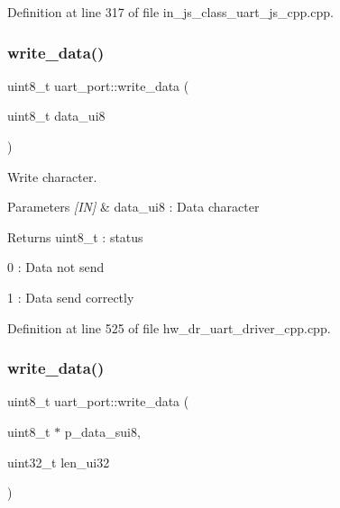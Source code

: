 Definition at line 317 of file in\+\_\+js\+\_\+class\+\_\+uart\+\_\+js\+\_\+cpp.\+cpp.

\mbox{\label{group___u_a_r_t_ga72cb7ce349132f57cfda6cb929f72bc5}} 
\subsubsection{write\_data()\hspace{0.1cm}{\footnotesize\ttfamily [1/3]}}
{\footnotesize\ttfamily uint8\+\_\+t uart\+\_\+port\+::write\+\_\+data (\begin{DoxyParamCaption}\item[{uint8\+\_\+t}]{data\+\_\+ui8 }\end{DoxyParamCaption})}



Write character. 


\begin{DoxyParams}{Parameters}
{\em \mbox{[}\+I\+N\mbox{]}} & data\+\_\+ui8 \+: Data character \\
\hline
\end{DoxyParams}
\begin{DoxyReturn}{Returns}
uint8\+\_\+t \+: status \begin{DoxyItemize}
\item 0 \+: Data not send \item 1 \+: Data send correctly \end{DoxyItemize}

\end{DoxyReturn}


Definition at line 525 of file hw\+\_\+dr\+\_\+uart\+\_\+driver\+\_\+cpp.\+cpp.

\mbox{\label{group___u_a_r_t_gabf69d3ab755d9fb473ece854ad748843}} 
\subsubsection{write\_data()\hspace{0.1cm}{\footnotesize\ttfamily [2/3]}}
{\footnotesize\ttfamily uint8\+\_\+t uart\+\_\+port\+::write\+\_\+data (\begin{DoxyParamCaption}\item[{uint8\+\_\+t $\ast$}]{p\+\_\+data\+\_\+sui8,  }\item[{uint32\+\_\+t}]{len\+\_\+ui32 }\end{DoxyParamCaption})}



